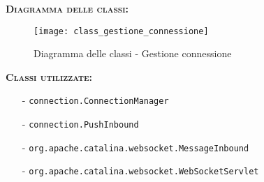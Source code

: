\begin{description}
	\item{\scshape\bfseries Diagramma delle classi:}
\begin{figure}[H]
  \centering
  \texttt{[image: class\_gestione\_connessione]}
  \caption{Diagramma delle classi - Gestione connessione}\label{fig:gestioneconnessione}
\end{figure}
	
	\item{\scshape\bfseries Classi utilizzate:}
	\begin{itemize}[nolistsep, noitemsep]
	  \item[-] \texttt{connection.ConnectionManager}
	  \item[-] \texttt{connection.PushInbound}
	  \item[-] \texttt{org.apache.catalina.websocket.MessageInbound}
	  \item[-] \texttt{org.apache.catalina.websocket.WebSocketServlet}
	\end{itemize}
\end{description}

